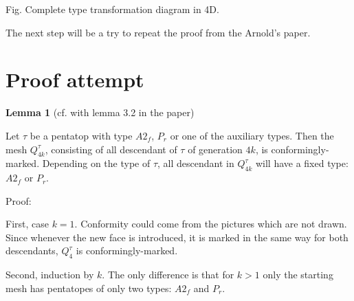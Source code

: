 \documentclass[a4paper,12pt]{amsart}
\numberwithin{equation}{section}
\begin{document}
\begin{center}
\newline
Fig. Complete type transformation diagram in 4D.
\end{center}

The next step will be a try to repeat the proof from the Arnold's paper.

\section{Proof attempt}

\textbf{Lemma 1} (cf. with lemma 3.2 in the paper)

Let $\tau$ be a pentatop with type $A2_f$, $P_r$ or one of the auxiliary types. Then the mesh $Q^{\tau}_{4k}$, consisting of all descendant of $\tau$ of generation $4k$, is conformingly-marked. Depending on the type of $\tau$, all descendant in $Q^{\tau}_{4k}$ will have a fixed type: $A2_f$ or $P_r$.

Proof:

First, case $k = 1$. Conformity could come from the pictures which are not drawn. Since whenever the new face is introduced, it is marked in the same way for both descendants, $Q^{\tau}_{4}$ is conformingly-marked. 

Second, induction by $k$. The only difference is that for $k > 1$ only the starting mesh has pentatopes of only two types: $A2_f$ and $P_r$.
\end{document}

